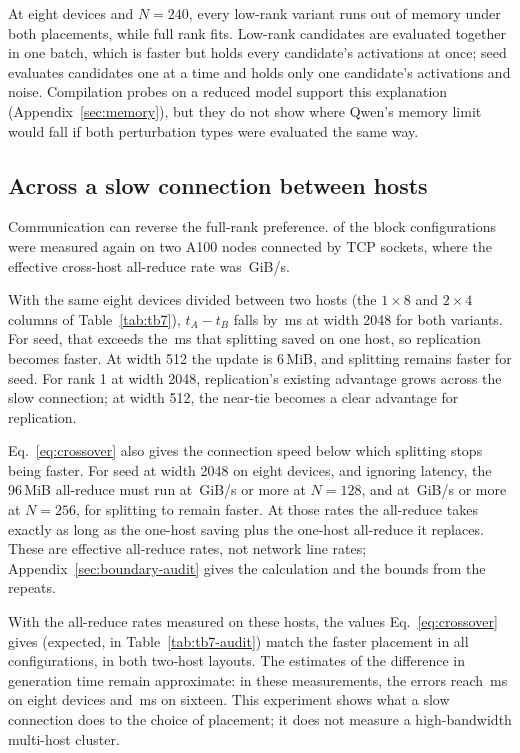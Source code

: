 At eight devices and $N=240$, every low-rank variant runs out of memory under both
placements, while full rank fits. Low-rank candidates are evaluated together in one batch,
which is faster but holds every candidate's activations at once; seed evaluates candidates
one at a time and holds only one candidate's activations and noise. Compilation probes on a
reduced model support this explanation (Appendix~\ref{sec:memory}), but they do not show
where Qwen's memory limit would fall if both perturbation types were evaluated the same
way.

\subsection{Across a slow connection between hosts}
\label{subsec:boundary}



Communication can reverse the full-rank preference. \HostConfigsCap{} of the block
configurations were measured again on two A100 nodes connected by TCP sockets, where the
effective cross-host all-reduce rate was \HostRate\,GiB/s.

With the same eight devices divided between two hosts (the $1\times8$ and $2\times4$ columns
of Table~\ref{tab:tb7}), $t_A-t_B$ falls by \HostBoundaryDrop\,ms at width 2048 for both
variants. For seed, that exceeds the \HostSeedSaving\,ms that splitting saved on one host, so
replication becomes faster. At width 512 the update is 6\,MiB, and splitting remains faster
for seed. For rank 1 at width 2048, replication's existing advantage grows across the
slow connection; at width 512, the near-tie becomes a clear advantage for replication.

Eq.~\ref{eq:crossover} also gives the connection speed below which splitting stops being
faster. For seed at width 2048 on eight devices, and ignoring latency, the 96\,MiB all-reduce
must run at \HostBreakEvenSmallN\,GiB/s or more at $N=128$, and at \HostBreakEvenLargeN\,GiB/s
or more at $N=256$, for splitting to remain faster. At those rates the all-reduce takes
exactly as long as the one-host saving plus the one-host all-reduce it replaces. These are
effective all-reduce rates, not network line rates; Appendix~\ref{sec:boundary-audit} gives
the calculation and the bounds from the repeats.

With the all-reduce rates measured on these hosts, the values Eq.~\ref{eq:crossover} gives
(expected, in Table~\ref{tab:tb7-audit}) match the faster placement in all
\HostExpectedMatches{} configurations, in both two-host layouts. The estimates of the
difference in generation time remain approximate: in these measurements, the errors reach
\HostExpectedErrorEight\,ms on eight devices and \HostExpectedOverSixteen\,ms on sixteen.
This experiment shows what a slow connection does to the choice of placement; it does not
measure a high-bandwidth multi-host cluster.


